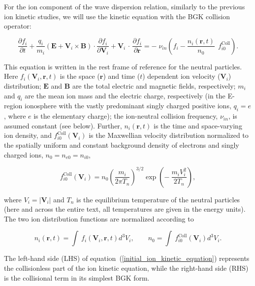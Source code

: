 \documentclass[draft]{agujournal2019}
\renewcommand{\vec}{\mathbf}
\begin{document}
For the ion component of the wave dispersion relation, similarly to the previous ion kinetic 
studies, we will use the kinetic equation with the BGK collision operator:
\begin{linenomath*}
\begin{equation}
\frac{\partial f_{i}}{\partial t}+\frac{q_{i}}{m_{i}}(\vec{E}+\vec
{V}_{i}\times\vec{B})  \cdot\frac{\partial f_{i}}{\partial\vec{V}_{i}
}+\vec{V}_{i}\mathbf{\,\cdot\,}\frac{\partial f_{i}}{\partial\vec{r}}
=-\;\nu_{in}\left(  f_{i}-\frac{n_{i}(\vec{r},t)}{n_{0}}\ \ f_{i0}
^{\mathrm{Coll}}\right).
\label{initial_ion_kinetic_equation}
\end{equation}
\end{linenomath*}
This equation is written in the rest frame of reference for the neutral particles. 
Here $f_{i}(\vec{V}_{i},\vec{r},t)$ is the space ($\vec{r}$) and time ($t$)
dependent ion velocity ($\vec{V}_{i}$) distribution; $\vec{E}$ and $\vec{B}$
are the total electric and magnetic fields, respectively; $m_{i}$ and $q_{i}$
are the mean ion mass and the electric charge, respectively (in the E-region
ionosphere with the vastly predominant singly charged positive ions, $q_{i}=e$, 
where $e$ is the elementary charge); the ion-neutral
collision frequency, $\nu_{in}$, is assumed constant (see below). Further, $n_{i}(\vec{r},t)$
is the time and space-varying ion density, and $f_{i0}^{\mathrm{Coll}}(\vec
{V}_{i})$ is the Maxwellian velocity distribution normalized to the 
spatially uniform and constant background density of electrons and singly
charged ions, $n_{0}=n_{e0}=n_{i0}$,
\begin{linenomath*}
\begin{equation}
f_{i0}^{\mathrm{Coll}}(\vec{V}_{i})  = n_{0}\left(
\frac{m_{i}}{2\pi T_{n}}\right)  ^{3/2}\exp\left(  -\ \frac{m_{i}V_{i}^{2}}{2T_{n}}\right),
\label{ion_cooling _Maxwellian}
\end{equation}
\end{linenomath*}
where $V_{i}=|\vec{V}_{i}|$ and $T_{n}$ is the equilibrium temperature of the
neutral particles (here and across the entire text, all temperatures are given in the energy
units). The two ion distribution functions are normalized according to
\begin{linenomath*}
\begin{equation}
n_{i}(\vec{r},t)=\int\ f_{i}(\vec{V}_{i},\vec{r},t)d^{3}V_{i},\qquad
n_{0}=\int\ f_{i0}^{\mathrm{Coll}}(\vec{V}_{i})d^{3}V_{i}%
.\label{normalization}%
\end{equation}
\end{linenomath*}
The left-hand side (LHS) of equation~(\ref{initial_ion_kinetic_equation})
represents the collisionless part of the ion kinetic equation, while the
right-hand side (RHS) is the collisional term in its simplest BGK form.
\end{document}
